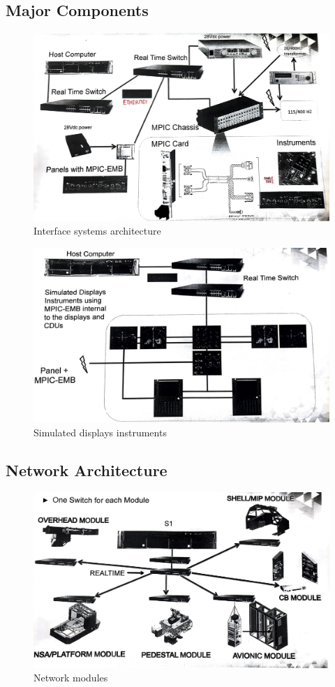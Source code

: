     \subsection{Major Components}
        \begin{figure}[H]
            \centering
            \includegraphics[width=0.6\linewidth]{img/require-component.png}
            \caption{Interface systems architecture}
        \end{figure}
        \begin{figure}[H]
            \centering
            \includegraphics[width=0.6\linewidth]{img/Simulated-Display.png}
            \caption{Simulated displays instruments}
        \end{figure}
    \subsection{Network Architecture}
        \begin{figure}[H]
            \centering
            \includegraphics[width=0.6\linewidth]{img/network.png}
            \caption{Network modules}
        \end{figure}
